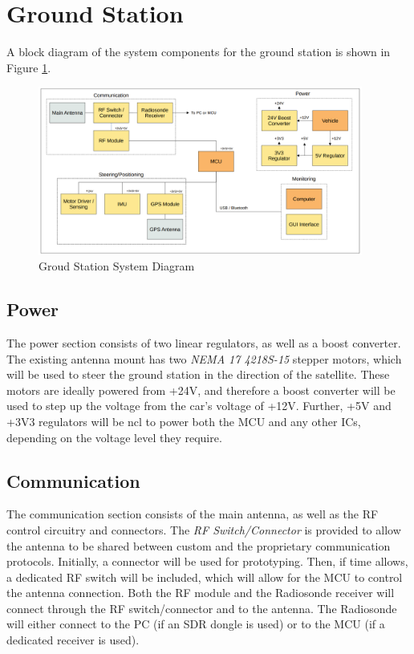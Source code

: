 \graphicspath{{./figures}}

\section{Ground Station}
A block diagram of the system components for the ground station is shown in Figure \ref{fig:gs_system}.

\begin{figure}[!htb]
  \centering
  \includegraphics[width=0.95\textwidth]{gs_system}
  \caption{Groud Station System Diagram}
  \label{fig:gs_system}
\end{figure}

\subsection{Power}
The power section consists of two linear regulators, as well as a boost converter. The existing antenna mount has two \textit{NEMA 17 4218S-15} stepper motors, which will be used to steer the ground station in the direction of the satellite. These motors are ideally powered from +24V, and therefore a boost converter will be used to step up the voltage from the car's voltage of +12V. Further, +5V and +3V3 regulators will be ncl to power both the MCU and any other ICs, depending on the voltage level they require.

\subsection{Communication}
The communication section consists of the main antenna, as well as the RF control circuitry and connectors. The \textit{RF Switch/Connector} is provided to allow the antenna to be shared between custom and the proprietary communication protocols. Initially, a connector will be used for prototyping. Then, if time allows, a dedicated RF switch will be included, which will allow for the MCU to control the antenna connection. Both the RF module and the Radiosonde receiver will connect through the RF switch/connector and to the antenna. The Radiosonde will either connect to the PC (if an SDR dongle is used) or to the MCU (if a dedicated receiver is used).

